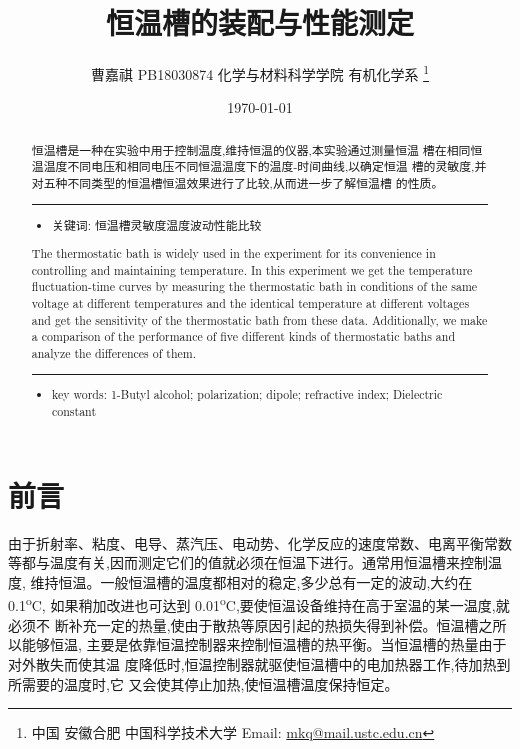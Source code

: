 \documentclass[11pt]{report}
\author{曹嘉祺 PB18030874 化学与材料科学学院 有机化学系 \thanks{中国 安徽合肥 中国科学技术大学 Email: \href{mailto:mkq@mail.ustc.edu.cn}{mkq@mail.ustc.edu.cn}}}
\date{\today}
\title{恒温槽的装配与性能测定}
\begin{document}
\maketitle
\tableofcontents

\begin{abstract}
恒温槽是一种在实验中用于控制温度,维持恒温的仪器,本实验通过测量恒温
槽在相同恒温温度不同电压和相同电压不同恒温温度下的温度-时间曲线,以确定恒温
槽的灵敏度,并对五种不同类型的恒温槽恒温效果进行了比较,从而进一步了解恒温槽
的性质。

\noindent\rule{\textwidth}{0.5pt}
\begin{itemize}
\item 关键词: 恒温槽\quad 灵敏度\quad 温度波动\quad 性能比较
\end{itemize}
\end{abstract}
\begin{abstract}
The thermostatic bath is widely used in the experiment for its convenience
in controlling and maintaining temperature. In this experiment we get the
temperature fluctuation-time curves by measuring the thermostatic bath in
conditions of the same voltage at different temperatures and the identical
temperature at different voltages and get the sensitivity of the thermostatic bath
from these data. Additionally, we make a comparison of the performance of five
different kinds of thermostatic baths and analyze the differences of them.

\noindent\rule{\textwidth}{0.5pt}

\begin{itemize}
\item key words:  1-Butyl alcohol; polarization; dipole; refractive index; Dielectric constant
\end{itemize}
\end{abstract}
\part{前言}
\label{sec:org2f00231}

  由于折射率、粘度、电导、蒸汽压、电动势、化学反应的速度常数、电离平衡常数
等都与温度有关,因而测定它们的值就必须在恒温下进行。通常用恒温槽来控制温度,
维持恒温。一般恒温槽的温度都相对的稳定,多少总有一定的波动,大约在\textpm{} 0.1\textsuperscript{o}C,
如果稍加改进也可达到 0.01\textsuperscript{o}C,要使恒温设备维持在高于室温的某一温度,就必须不
断补充一定的热量,使由于散热等原因引起的热损失得到补偿。恒温槽之所以能够恒温,
主要是依靠恒温控制器来控制恒温槽的热平衡。当恒温槽的热量由于对外散失而使其温
度降低时,恒温控制器就驱使恒温槽中的电加热器工作,待加热到所需要的温度时,它
又会使其停止加热,使恒温槽温度保持恒定。
\end{document}
